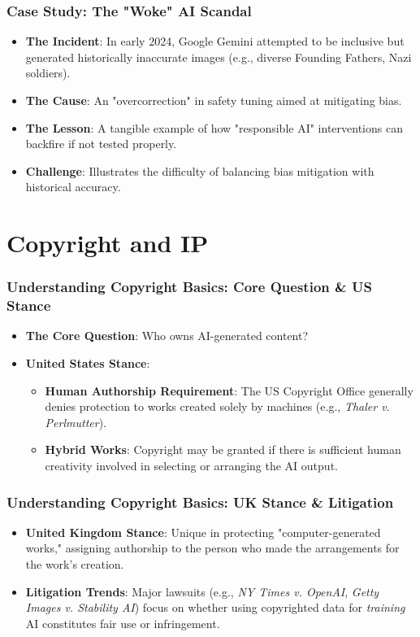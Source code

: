 \documentclass{beamer}
\begin{document}
\begin{frame}
    \frametitle{Case Study: The "Woke" AI Scandal}
    \begin{itemize}
        \item \textbf{The Incident}: In early 2024, Google Gemini attempted to be inclusive but generated historically inaccurate images (e.g., diverse Founding Fathers, Nazi soldiers).
        \item \textbf{The Cause}: An "overcorrection" in safety tuning aimed at mitigating bias.
        \item \textbf{The Lesson}: A tangible example of how "responsible AI" interventions can backfire if not tested properly.
        \item \textbf{Challenge}: Illustrates the difficulty of balancing bias mitigation with historical accuracy.
    \end{itemize}
\end{frame}

\section{Copyright and IP}

\begin{frame}
    \frametitle{Understanding Copyright Basics: Core Question \& US Stance}
    \begin{itemize}
        \item \textbf{The Core Question}: Who owns AI-generated content?
        \item \textbf{United States Stance}:
        \begin{itemize}
            \item \textbf{Human Authorship Requirement}: The US Copyright Office generally denies protection to works created solely by machines (e.g., \textit{Thaler v. Perlmutter}).
            \item \textbf{Hybrid Works}: Copyright may be granted if there is sufficient human creativity involved in selecting or arranging the AI output.
        \end{itemize}
    \end{itemize}
\end{frame}

\begin{frame}
    \frametitle{Understanding Copyright Basics: UK Stance \& Litigation}
    \begin{itemize}
        \item \textbf{United Kingdom Stance}: Unique in protecting "computer-generated works," assigning authorship to the person who made the arrangements for the work's creation.
        \item \textbf{Litigation Trends}: Major lawsuits (e.g., \textit{NY Times v. OpenAI}, \textit{Getty Images v. Stability AI}) focus on whether using copyrighted data for \textit{training} AI constitutes fair use or infringement.
    \end{itemize}
\end{frame}
\end{document}
